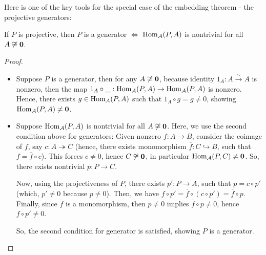 \documentclass{article}
\begin{document}
Here is one of the key tools for the special case of the embedding theorem - the projective generators:
\begin{lem}
    If $P$ is projective, then $P$ is a generator $\iff$ $\mathrm{Hom}_\mathcal{A}(P,A)$ is nontrivial for all $A\not\cong \mathbf{0}$.
\end{lem}
\begin{proof}
    
    \hfil

    \begin{itemize}
        \item[$\implies$:] Suppose $P$ is a generator, then for any $A\not\cong \mathbf{0}$, because identity $1_A:A\xrightarrow{\sim}A$ is nonzero, then the map $1_A\circ\_:\mathrm{Hom}_\mathcal{A}(P,A)\rightarrow\mathrm{Hom}_\mathcal{A}(P,A)$ is nonzero. Hence, there exists $g\in \mathrm{Hom}_\mathcal{A}(P,A)$ such that $1_A\circ g = g\neq 0$, showing $\mathrm{Hom}_\mathcal{A}(P,A)\neq \mathbf{0}$.
        
        \hfil

        \item[$\impliedby$:] Suppose $\mathrm{Hom}_\mathcal{A}(P,A)$ is nontrivial for all $A\not\cong \mathbf{0}$. Here, we use the second condition above for generators: Given nonzero $f:A\rightarrow B$, consider the coimage of $f$, say $c:A\twoheadrightarrow C$ (hence, there exists monomorphism $\overline{f}:C\hookrightarrow B$, such that $f = \overline{f}\circ c$). This forces $c\neq 0$, hence $C\not\cong \mathbf{0}$, in particular $\mathrm{Hom}_\mathcal{A}(P,C)\neq \mathbf{0}$. So, there exists nontrivial $p:P\rightarrow C$. 
        
        Now, using the projectiveness of $P$, there exists $p':P\rightarrow A$, such that $p = c\circ p'$ (which, $p'\neq 0$ because $p\neq 0$). Then, we have $f\circ p' = \overline{f}\circ (c\circ p') = \overline{f}\circ p$. Finally, since $\overline{f}$ is a monomorphism, then $p\neq 0$ implies $\overline{f}\circ p\neq 0$, hence $f\circ p'\neq 0$.

        So, the second condition for generator is satisfied, showing $P$ is a generator.
    \end{itemize}
\end{proof}
\end{document}
